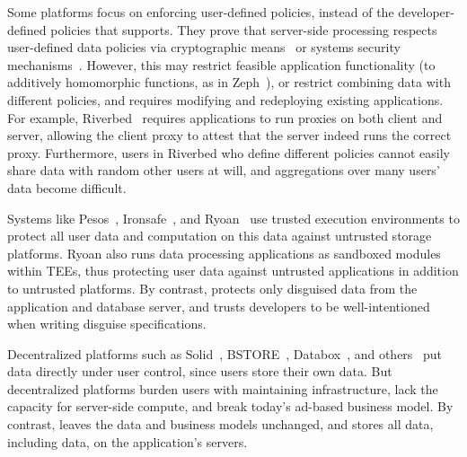 Some platforms focus on enforcing user-defined policies, instead of the
developer-defined policies that \sys supports. They prove that server-side
processing respects user-defined data policies via cryptographic
means~\cite{zeph} or systems security mechanisms~\cite{riverbed}.
%
However, this may restrict feasible application functionality (\eg to additively
homomorphic functions, as in Zeph~\cite{zeph}), or restrict combining data with
different policies, and requires modifying and redeploying existing
applications.
%
For example, Riverbed~\cite{riverbed} requires applications to run proxies on
both client and server, allowing the client proxy to attest that the server
indeed runs the correct proxy. 
%
Furthermore, users in Riverbed who define different policies cannot easily share
data with random other users at will, and aggregations over many users' data
become difficult.

%
Systems like Pesos~\cite{pesos}, Ironsafe~\cite{ironsafe}, and
Ryoan~\cite{ryoan} use trusted execution environments to protect all user data
and computation on this data against untrusted storage platforms.  Ryoan also
runs data processing applications as sandboxed modules within TEEs, thus
protecting user data against untrusted applications in addition to untrusted
platforms. 
By contrast, \sys protects only disguised data from the application and database
server, and trusts
developers to be
well-intentioned when writing disguise specifications.

%

Decentralized platforms such as Solid~\cite{solid}, BSTORE~\cite{bstore},
Databox~\cite{databox}, and others~\cite{diy, amber, oort, w5, blockstack} put
data directly under user control, since users store their own data.
%
But decentralized platforms burden users with maintaining infrastructure, lack
the capacity for server-side compute, and break today's ad-based
business model.
%
By contrast, \sys leaves the data and business models unchanged,
and stores all data, including \xxed data, on the application's servers.
%

